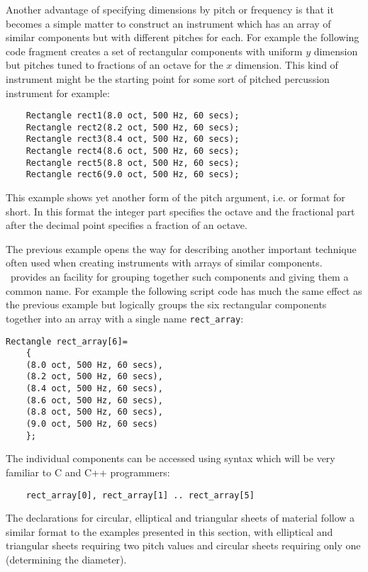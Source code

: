 Another advantage of specifying dimensions by pitch or frequency is that it
becomes a simple matter to construct an instrument which has an array of
similar components but with different pitches for each. For example the
following code fragment creates a set of rectangular components with uniform
$y$ dimension but pitches tuned to fractions of an octave for the
$x$ dimension. This kind of instrument might be the starting point
for some sort of pitched percussion instrument for example:

\begin{verbatim}
    Rectangle rect1(8.0 oct, 500 Hz, 60 secs);
    Rectangle rect2(8.2 oct, 500 Hz, 60 secs);
    Rectangle rect3(8.4 oct, 500 Hz, 60 secs);
    Rectangle rect4(8.6 oct, 500 Hz, 60 secs);
    Rectangle rect5(8.8 oct, 500 Hz, 60 secs);
    Rectangle rect6(9.0 oct, 500 Hz, 60 secs);
\end{verbatim}

This example shows yet another form of the pitch argument, i.e. 
or  format for short. In this format the integer part specifies
the octave and the fractional part after the decimal point specifies a
fraction of an octave. 

The previous example opens the way for describing another important
technique often used when creating instruments with arrays of similar components.
\tao\ provides an  facility for grouping
together such components and giving them a common name. For example
the following script code has much the same effect as the previous example
but logically groups the six rectangular components together into an
array with a single name \verb|rect_array|:

\begin{verbatim}
Rectangle rect_array[6]=
    {
    (8.0 oct, 500 Hz, 60 secs),
    (8.2 oct, 500 Hz, 60 secs),
    (8.4 oct, 500 Hz, 60 secs),
    (8.6 oct, 500 Hz, 60 secs),
    (8.8 oct, 500 Hz, 60 secs),
    (9.0 oct, 500 Hz, 60 secs)
    };
\end{verbatim}

The individual components can be accessed using syntax which will be very
familiar to C and C++ programmers:

\begin{verbatim}
    rect_array[0], rect_array[1] .. rect_array[5]
\end{verbatim}

The declarations for circular, elliptical and triangular sheets of material
follow a similar format to the examples presented in this section, with
elliptical and triangular sheets requiring two pitch values and circular
sheets requiring only one (determining the diameter).

